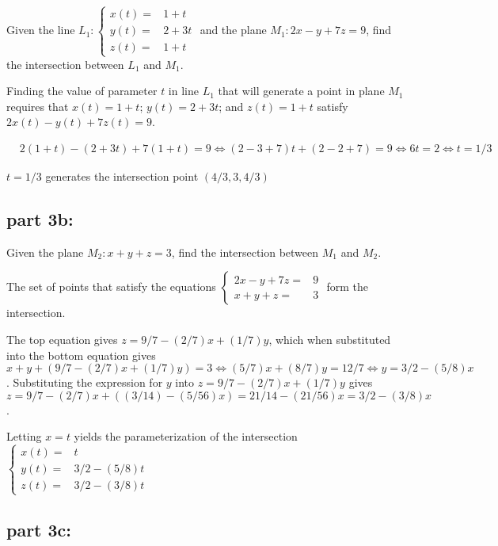 \documentclass{article}
\newcommand{\dr}[1]{\textcolor{dark_red}{#1}}
\begin{document}
Given the line \(L_1: \left\{\begin{array}{rl} x(t) = & 1 + t \\ y(t) = & 2 + 3t \\ z(t) = & 1 + t \end{array}\right.\) and the plane \(M_1: 2x - y + 7z = 9\), find the intersection between \(L_1\) and \(M_1\).

\dr{Finding the value of parameter \(t\) in line \(L_1\) that will generate a point in plane \(M_1\) requires that \(x(t) = 1 + t\); \(y(t) = 2 + 3t\); and \(z(t) = 1 + t\) satisfy \(2x(t) - y(t) + 7z(t) = 9\).}

\dr{\begin{align*}
& 2(1+t) - (2+3t) + 7(1+t) = 9  
\iff (2 - 3 + 7)t + (2 - 2 + 7) = 9 
\iff 6t = 2 
\iff t = 1/3
\end{align*}}

\dr{\(t = 1/3\) generates the intersection point \((4/3, 3, 4/3)\)}


\subsection*{part 3b:}

Given the plane \(M_2: x + y + z = 3\), find the intersection between \(M_1\) and \(M_2\).

\dr{The set of points that satisfy the equations \(\left\{\begin{array}{rl} 2x - y + 7z = & 9 \\ x + y + z = & 3 \end{array}\right.\) form the intersection.}

\dr{The top equation gives \(z = 9/7 - (2/7)x + (1/7)y\), which when substituted into the bottom equation gives \(x + y + (9/7 - (2/7)x + (1/7)y) = 3 \iff (5/7)x + (8/7)y = 12/7 \iff y = 3/2 - (5/8)x\). Substituting the expression for \(y\) into \(z = 9/7 - (2/7)x + (1/7)y\) gives \(z = 9/7 - (2/7)x + ((3/14) - (5/56)x) = 21/14 - (21/56)x = 3/2 - (3/8)x\).}

\dr{Letting \(x = t\) yields the parameterization of the intersection \(\left\{\begin{array}{rl} x(t) = & t \\ y(t) = & 3/2 - (5/8)t \\ z(t) = & 3/2 - (3/8)t \end{array}\right.\)}


\subsection*{part 3c:}
\end{document}
